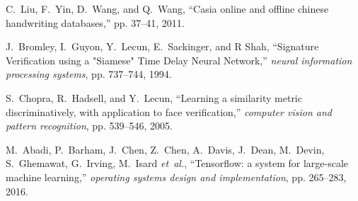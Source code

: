 \documentclass[conference]{IEEEtran}
\begin{document}
\begin{thebibliography}{1}
C.~Liu, F.~Yin, D.~Wang, and Q.~Wang, ``Casia online and offline chinese
handwriting databases,'' pp. 37--41, 2011.

J.~Bromley, I.~Guyon, Y.~Lecun, E.~Sackinger, and R Shah, ``Signature Verification using a "Siamese" Time Delay Neural Network,'' \emph{neural information processing systems}, pp. 737--744, 1994.

S.~Chopra, R.~Hadsell, and Y.~Lecun, ``Learning a similarity metric discriminatively, with application to face verification,'' \emph{computer vision and pattern recognition}, pp. 539--546, 2005.

M.~Abadi, P.~Barham, J.~Chen, Z.~Chen, A.~Davis, J.~Dean, M.~Devin,
S.~Ghemawat, G.~Irving, M.~Isard \emph{et~al.}, ``Tensorflow: a system for
large-scale machine learning,'' \emph{operating systems design and
	implementation}, pp. 265--283, 2016.

\end{thebibliography}
\end{document}
